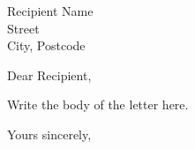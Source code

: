 \documentclass[11pt]{letter}
\begin{document}
\begin{letter}{Recipient Name \\ Street \\ City, Postcode}

\opening{Dear Recipient,}

Write the body of the letter here.

\closing{Yours sincerely,}

\end{letter}
\end{document}
